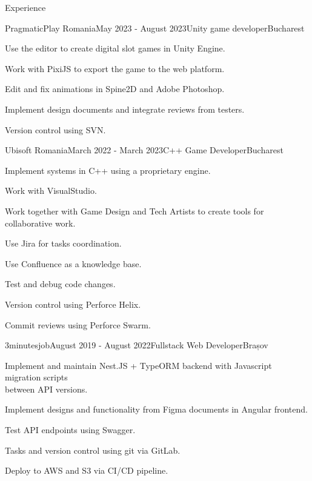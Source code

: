 \documentclass[
	11pt, %
]{resume} %
\begin{document}
\begin{rSection}{Experience}

	\begin{rSubsection}{PragmaticPlay Romania}{May 2023 - August 2023}{Unity game developer}{Bucharest}
		\item Use the editor to create digital slot games in Unity Engine.
		\item Work with PixiJS to export the game to the web platform.
		\item Edit and fix animations in Spine2D and Adobe Photoshop.
		\item Implement design documents and integrate reviews from testers.
		\item Version control using SVN.
	\end{rSubsection}


	\begin{rSubsection}{Ubisoft Romania}{March 2022 - March 2023}{C++ Game Developer}{Bucharest}
		\item Implement systems in C++ using a proprietary engine.
		\item Work with VisualStudio.
		\item Work together with Game Design and Tech Artists to create tools for collaborative work.
		\item Use Jira for tasks coordination.
		\item Use Confluence as a knowledge base.
		\item Test and debug code changes.
		\item Version control using Perforce Helix.
		\item Commit reviews using Perforce Swarm.
	\end{rSubsection}


	\begin{rSubsection}{3minutesjob}{August 2019 - August 2022}{Fullstack Web Developer}{Brașov}
		\item Implement and maintain Nest.JS + TypeORM backend with Javascript migration scripts \\
    between API versions.
		\item Implement designs and functionality from Figma documents in Angular frontend.
		\item Test API endpoints using Swagger.
		\item Tasks and version control using git via GitLab.
		\item Deploy to AWS and S3 via CI/CD pipeline.
	\end{rSubsection}

\end{rSection}
\end{document}
